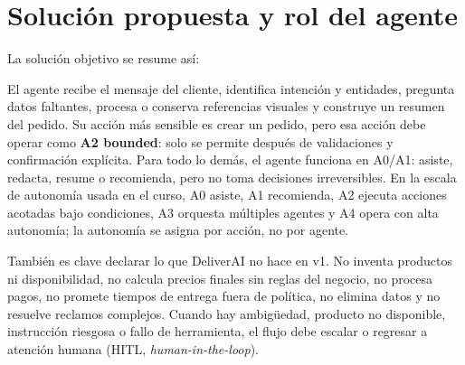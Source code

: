\section{Solución propuesta y rol del agente}

La solución objetivo se resume así:

\begin{center}
\end{center}

El agente recibe el mensaje del cliente, identifica intención y entidades, pregunta datos faltantes, procesa o conserva referencias visuales y construye un resumen del pedido. Su acción más sensible es crear un pedido, pero esa acción debe operar como \textbf{A2 bounded}: solo se permite después de validaciones y confirmación explícita. Para todo lo demás, el agente funciona en A0/A1: asiste, redacta, resume o recomienda, pero no toma decisiones irreversibles. En la escala de autonomía usada en el curso, A0 asiste, A1 recomienda, A2 ejecuta acciones acotadas bajo condiciones, A3 orquesta múltiples agentes y A4 opera con alta autonomía; la autonomía se asigna por acción, no por agente.

También es clave declarar lo que DeliverAI no hace en v1. No inventa productos ni disponibilidad, no calcula precios finales sin reglas del negocio, no procesa pagos, no promete tiempos de entrega fuera de política, no elimina datos y no resuelve reclamos complejos. Cuando hay ambigüedad, producto no disponible, instrucción riesgosa o fallo de herramienta, el flujo debe escalar o regresar a atención humana (HITL, \textit{human-in-the-loop}).
